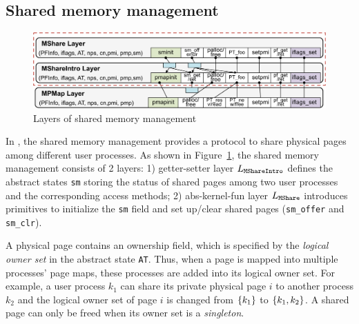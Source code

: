 \subsection{Shared memory management} 
\label{sec:base:sm}
{
\begin{figure}\centering
\includegraphics[scale=0.6]{figs/sm_layer}	
\caption{Layers of shared memory management}
\label{fig:base:sm:layers}
\hrulefill
\end{figure}
}
In \mCTOS{}, the shared memory management provides a protocol to share physical
pages among different user processes. 
As shown in
Figure~\ref{fig:base:sm:layers}, the shared memory management  consists of 2 layers: 1) getter-setter layer $L_{\texttt{MShareIntro}}$
defines the abstract states \verb"sm" storing the status of shared pages among two user processes and the corresponding access methods; 
2) abs-kernel-fun layer $L_{\texttt{MShare}}$
introduces primitives to initialize the \verb"sm" field
and set up/clear shared pages (\verb"sm_offer" and \verb"sm_clr").

A physical page contains an ownership field, which is specified by the
\emph{logical owner set} in the abstract state \verb"AT".
Thus, when a page is mapped into multiple processes' page maps,
these processes are added into its logical owner set.  
For example, a
user process $k_1$ can share its private physical page $i$ to another
 process $k_2$ and the logical owner
set of page $i$ is changed from $\{k_1\}$ to $\{k_1,k_2\}$.
A shared page can only be
freed when its owner set is a \emph{singleton}.


